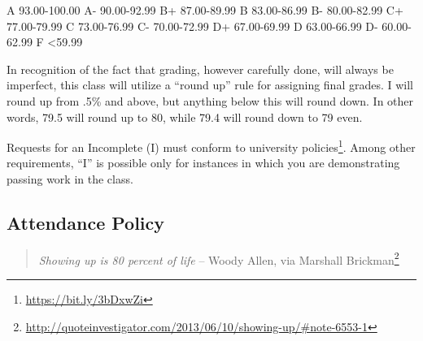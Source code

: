 \documentclass[
  letterpaper,
  DIV=11,
  numbers=noendperiod,
  oneside]{scrartcl}
\DeclareRobustCommand{\href}[2]{#2\footnote{\url{#1}}}
\begin{document}
A 93.00-100.00 \textbar{} A- 90.00-92.99 B+ 87.00-89.99 \textbar{} B
83.00-86.99 \textbar{} B- 80.00-82.99 C+ 77.00-79.99 \textbar{} C
73.00-76.99 \textbar{} C- 70.00-72.99 D+ 67.00-69.99 \textbar{} D
63.00-66.99 \textbar{} D- 60.00-62.99 F \textless59.99

\begin{tcolorbox}[enhanced jigsaw, breakable, colbacktitle=quarto-callout-note-color!10!white, colframe=quarto-callout-note-color-frame, opacitybacktitle=0.6, title=\textcolor{quarto-callout-note-color}{\faInfo}\hspace{0.5em}{Note}, opacityback=0, colback=white, bottomrule=.15mm, toprule=.15mm, left=2mm, rightrule=.15mm, toptitle=1mm, titlerule=0mm, arc=.35mm, bottomtitle=1mm, leftrule=.75mm, coltitle=black]
In recognition of the fact that grading, however carefully done, will
always be imperfect, this class will utilize a ``round up'' rule for
assigning final grades. I will round up from .5\% and above, but
anything below this will round down. In other words, 79.5 will round up
to 80, while 79.4 will round down to 79 even.
\end{tcolorbox}

\begin{tcolorbox}[enhanced jigsaw, breakable, colbacktitle=quarto-callout-important-color!10!white, colframe=quarto-callout-important-color-frame, opacitybacktitle=0.6, title=\textcolor{quarto-callout-important-color}{\faExclamation}\hspace{0.5em}{Important}, opacityback=0, colback=white, bottomrule=.15mm, toprule=.15mm, left=2mm, rightrule=.15mm, toptitle=1mm, titlerule=0mm, arc=.35mm, bottomtitle=1mm, leftrule=.75mm, coltitle=black]
Requests for an Incomplete (I) must conform to
\href{https://bit.ly/3bDxwZi}{university policies}. Among other
requirements, ``I'' is possible only for instances in which you are
demonstrating passing work in the class.
\end{tcolorbox}

\hypertarget{attendance-policy}{%
\subsection{Attendance Policy}\label{attendance-policy}}

\begin{quote}
\emph{Showing up is 80 percent of life} -- Woody Allen,
\href{http://quoteinvestigator.com/2013/06/10/showing-up/\#note-6553-1}{via
Marshall Brickman}
\end{quote}
\end{document}
